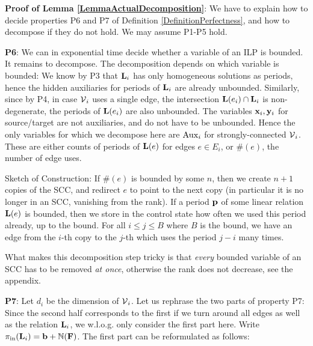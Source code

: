 
\textbf{Proof of Lemma \ref{LemmaActualDecomposition}}: We have to explain how to decide properties P6 and P7 of Definition \ref{DefinitionPerfectness}, and how to decompose if they do not hold. We may assume P1-P5 hold.

\textbf{P6}: We can in exponential time decide whether a variable of an ILP is bounded. It remains to decompose. The decomposition depends on which variable is bounded: We know by P3 that \(\mathbf{L}_i\) has only homogeneous solutions as periods, hence the hidden auxiliaries for periods of \(\mathbf{L}_i\) are already unbounded. Similarly, since by P4, in case \(\operatorname{\mathcal{V}}_i\) uses a single edge, the intersection \(\mathbf{L}(e_i) \cap \mathbf{L}_i\) is non-degenerate, the periods of \(\mathbf{L}(e_i)\) are also unbounded. The variables \(\mathbf{x}_i, \mathbf{y}_i\) for source/target are not auxiliaries, and do not have to be unbounded. Hence the only variables for which we decompose here are \(\operatorname{Aux}_i\) for strongly-connected \(\operatorname{\mathcal{V}}_i\). These are either counts of periods of \(\mathbf{L}(e)\) for edges \(e \in E_i\), or \(\#(e)\), the number of edge uses.

Sketch of Construction: If \(\#(e)\) is bounded by some \(n\), then we create \(n+1\) copies of the SCC, and redirect \(e\) to point to the next copy (in particular it is no longer in an SCC, vanishing from the rank). If a period \(\mathbf{p}\) of some linear relation \(\mathbf{L}(e)\) is bounded, then we store in the control state how often we used this period already, up to the bound. For all \(i \leq j \leq B\) where \(B\) is the bound, we have an edge from the \(i\)-th copy to the \(j\)-th which uses the period \(j-i\) many times.

What makes this decomposition step tricky is that \emph{every} bounded variable of an SCC has to be removed \emph{at once}, otherwise the rank does not decrease, see the appendix.

\textbf{P7}: Let \(d_i\) be the dimension of \(\operatorname{\mathcal{V}}_i\). Let us rephrase the two parts of property P7: Since the second half corresponds to the first if we turn around all edges as well as the relation \(\mathbf{L}_i\), we w.l.o.g. only consider the first part here. Write \(\pi_{\text{in}}(\mathbf{L}_i)=\mathbf{b}+\mathbb{N}(\mathbf{F})\). The first part can be reformulated as follows:


